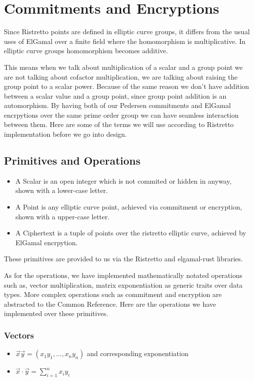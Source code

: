 \documentclass[12pt,a4paper]{report}
\begin{document}
\section{Commitments and Encryptions}
Since Ristretto points are defined in elliptic curve groups, it differs from the usual uses of ElGamal over a finite field where the homomorphism is multiplicative. 
In elliptic curve groups homomorphism becomes additive\cite{decaf}.\par
This means when we talk about multiplication of a scalar and a group point we are not talking about cofactor multiplication, 
we are talking about raising the group point to a scalar power. Because of the same reason we don't have addition between 
a scalar value and a group point, since group point addition is an automorphism.
By having both of our Pedersen commitments and ElGamal encrpytions over the same prime order group we can have seamless interaction between them. 
Here are some of the terms we will use according to Ristretto implementation before we go into design.
\subsection*{Primitives and Operations}
\begin{itemize}
	\item A Scalar is an open integer which is not commited or hidden in anyway, shown with a lower-case letter.
	\item A Point is any elliptic curve point, achieved via commitment or encryption, shown with a upper-case letter. 
	\item A Ciphertext is a tuple of points over the ristretto elliptic curve, achieved by ElGamal encrpytion.
\end{itemize}
These primitives are provided to us via the Ristretto and elgamal-rust\cite{egrust} libraries.\par
As for the operations, we have implemented mathematically notated operations such as, 
vector multiplication, matrix exponentiation as generic traits over data types.
More complex operations such as commitment and encryption are abstracted to the Common Reference.
Here are the operations we have implemented over these primitives.
\subsubsection{Vectors}
\begin{itemize}
	\item $\vec{x}\vec{y} = (x_1y_1,\ldots,x_ny_n)$ and corresponding exponentiation
	\item $\vec{x}\cdot\vec{y} = \sum_{i=1}^n x_iy_i$
\end{itemize}
\end{document}
